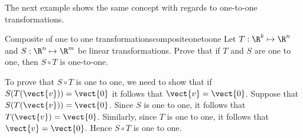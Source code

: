 The next example shows the same concept with regards to one-to-one transformations. 

\begin{example}{Composite of one to one transformations}{compositeonetoone}
Let $T: \R^k \mapsto \R^n$ and $S: \R^n \mapsto \R^m$ be linear transformations. 
Prove that if $T$ and $S$ are one to one, then $S \circ T$ 
is one-to-one.
\end{example}

\begin{solution}
To prove that $S \circ T$ is one to one, we need to show that if $S(T (\vect{v})) = \vect{0}$ it follows that $\vect{v} = \vect{0}$. 
Suppose that  $S(T (\vect{v})) = \vect{0}$. Since $S$ is one to one, it follows that  $T (\vect{v}) = \vect{0}$. Similarly, since $T$ is one to one, it follows that $\vect{v} = \vect{0}$. Hence $S \circ T$ is one to one. 
\end{solution}
